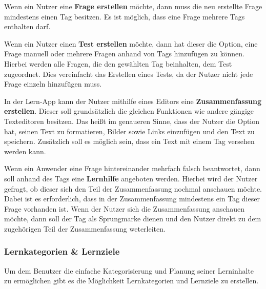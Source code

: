 \noindent
Wenn ein Nutzer eine \textbf{Frage erstellen} möchte, dann muss die neu erstellte Frage mindestens einen Tag besitzen. Es ist möglich, dass eine Frage mehrere Tags enthalten darf. \newline

\noindent
Wenn ein Nutzer einen \textbf{Test erstellen} möchte, dann hat dieser die Option, eine Frage manuell oder mehrere Fragen anhand von Tags hinzufügen zu können. Hierbei werden alle Fragen, die den gewählten Tag beinhalten, dem Test zugeordnet. Dies vereinfacht das Erstellen eines Tests, da der Nutzer nicht jede Frage einzeln hinzufügen muss. \newline

\noindent
In der Lern-App kann der Nutzer mithilfe eines Editors eine \textbf{Zusammenfassung erstellen}. Dieser soll grundsätzlich die gleichen Funktionen wie andere gängige Texteditoren besitzen. Das heißt im genaueren Sinne, dass der Nutzer die Option hat, seinen Text zu formatieren, Bilder sowie Links einzufügen und den Text zu speichern. Zusätzlich soll es möglich sein, dass ein Text mit einem Tag versehen werden kann. \newline 

\noindent
Wenn ein Anwender eine Frage hintereinander mehrfach falsch beantwortet, dann soll anhand des Tags eine \textbf{Lernhilfe} angeboten werden. Hierbei wird der Nutzer gefragt, ob dieser sich den Teil der Zusammenfassung nochmal anschauen möchte. Dabei ist es erforderlich, dass in der Zusammenfassung mindestens ein Tag dieser Frage vorhanden ist. Wenn der Nutzer sich die Zusammenfassung anschauen möchte, dann soll der Tag als Sprungmarke dienen und den Nutzer direkt zu dem zugehörigen Teil der Zusammenfassung weterleiten. \newline 

\subsubsection{Lernkategorien \& Lernziele}
Um dem Benutzer die einfache Kategorisierung und Planung seiner Lerninhalte zu ermöglichen gibt es die Möglichkeit Lernkategorien und Lernziele zu erstellen. \newline

